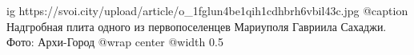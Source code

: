  
 
 
 
 

\ifcmt
  ig https://svoi.city/upload/article/o_1fglun4be1qih1cdhbrh6vbil43c.jpg
  @caption Надгробная плита одного из первопоселенцев Мариуполя Гавриила Сахаджи. Фото: Архи-Город
  @wrap center
  @width 0.5
\fi
